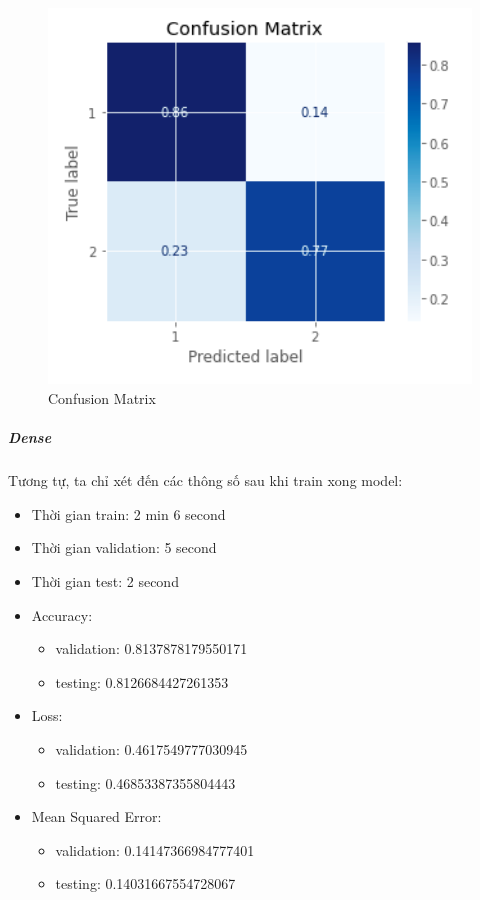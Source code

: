 \documentclass{article}
\begin{document}
\begin{figure}[H]
	\centering
	\includegraphics[width=6in]{images/confusionMatrixSVM_model2_1.png}
	\caption{Confusion Matrix}
\end{figure}

\subparagraph{Dense}

Tương tự, ta chỉ xét đến các thông số sau khi train xong model:

\begin{itemize}
	\item Thời gian train: 2 min 6 second
	\item Thời gian validation: 5 second
	\item Thời gian test: 2 second
	\item Accuracy:
	      \begin{itemize}
		      \item validation: 0.8137878179550171
		      \item testing: 0.8126684427261353
	      \end{itemize}
	\item Loss:
	      \begin{itemize}
		      \item validation: 0.4617549777030945
		      \item testing: 0.46853387355804443
	      \end{itemize}
	\item Mean Squared Error:
	      \begin{itemize}
		      \item validation: 0.14147366984777401
		      \item testing: 0.14031667554728067
	      \end{itemize}
\end{itemize}
\end{document}
